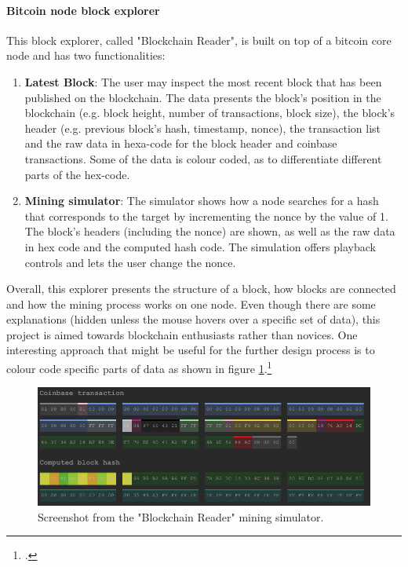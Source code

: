 \paragraph{Bitcoin node block explorer} This block explorer, called "Blockchain Reader", is built on top of a bitcoin core node and has two functionalities:
\begin{enumerate}
    \item \textbf{Latest Block}: The user may inspect the most recent block that has been published on the blockchain. The data presents the block's position in the blockchain (e.g. block height, number of transactions, block size), the block's header (e.g. previous block's hash, timestamp, nonce), the transaction list and the raw data in hexa-code for the block header and coinbase transactions. Some of the data is colour coded, as to differentiate different parts of the hex-code.
    \item \textbf{Mining simulator}: The simulator shows how a node searches for a hash that corresponds to the target by incrementing the nonce by the value of 1. The block's headers (including the nonce) are shown, as well as the raw data in hex code and the computed hash code. The simulation offers playback controls and lets the user change the nonce.
\end{enumerate}
Overall, this explorer presents the structure of a block, how blocks are connected and how the mining process works on one node. Even though there are some explanations (hidden unless the mouse hovers over a specific set of data), this project is aimed towards blockchain enthusiasts rather than novices. One interesting approach that might be useful for the further design process is to colour code specific parts of data as shown in figure \ref{fig:BlockchainReader}.\footcite[Cf.][]{JornCYoghBlockchainReader2017}

\begin{figure}
    \centering
    \includegraphics[width=\linewidth]{latex-vorlage_v1.5/graphics/Bildschirmfo.png}
    \caption[Screenshot from the "Blockchain Reader" mining simulator.]{Screenshot from the "Blockchain Reader" mining simulator.\footnotemark}
    \label{fig:BlockchainReader}
\end{figure}

